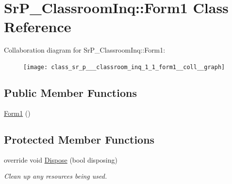 \hypertarget{class_sr_p___classroom_inq_1_1_form1}{
\section{\-Sr\-P\-\_\-\-Classroom\-Inq\-:\-:\-Form1 \-Class \-Reference}
\label{class_sr_p___classroom_inq_1_1_form1}
}


\-Collaboration diagram for \-Sr\-P\-\_\-\-Classroom\-Inq\-:\-:\-Form1\-:
\nopagebreak
\begin{figure}[H]
\begin{center}
\leavevmode
\texttt{[image: class\_sr\_p\_\_\_classroom\_inq\_1\_1\_form1\_\_coll\_\_graph]}
\end{center}
\end{figure}
\subsection*{\-Public \-Member \-Functions}
\begin{DoxyCompactItemize}
\item 
\hyperlink{class_sr_p___classroom_inq_1_1_form1_af6bb96bce0d0e2ee4ecf22e9646d625c}{\-Form1} ()
\end{DoxyCompactItemize}
\subsection*{\-Protected \-Member \-Functions}
\begin{DoxyCompactItemize}
\item 
override void \hyperlink{class_sr_p___classroom_inq_1_1_form1_ac653b186a9b7176d47382c35d7474840}{\-Dispose} (bool disposing)
\begin{DoxyCompactList}\small\item\em \-Clean up any resources being used. \end{DoxyCompactList}\end{DoxyCompactItemize}
